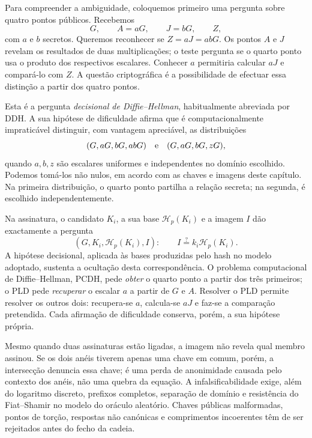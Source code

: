 Para compreender a ambiguidade, coloquemos primeiro uma pergunta sobre
quatro pontos públicos. Recebemos
\[
 G,\qquad A=aG,\qquad J=bG,\qquad Z,
\]
com \(a\) e \(b\) secretos. Queremos reconhecer se \(Z=aJ=abG\).
Os pontos \(A\) e \(J\) revelam os resultados de duas multiplicações;
o teste pergunta se o quarto ponto usa o produto dos respectivos
escalares. Conhecer \(a\) permitiria calcular \(aJ\) e compará-lo com
\(Z\). A questão criptográfica é a possibilidade de efectuar essa
distinção a partir dos quatro pontos.

Esta é a pergunta \emph{decisional de Diffie--Hellman}, habitualmente
abreviada por DDH. A sua hipótese de dificuldade afirma que é
computacionalmente impraticável distinguir, com vantagem apreciável,
as distribuições
\[
 (G,aG,bG,abG)
 \quad\hbox{e}\quad
 (G,aG,bG,zG),
\]
quando \(a,b,z\) são escalares uniformes e independentes no domínio
escolhido. Podemos tomá-los não nulos, em acordo com as chaves e imagens
deste capítulo. Na primeira distribuição, o quarto ponto partilha a
relação secreta; na segunda, é escolhido independentemente.

Na assinatura, o candidato \(K_i\), a sua base \(\mathcal H_p(K_i)\)
e a imagem \(I\) dão exactamente a pergunta
\[
 (G,K_i,\mathcal H_p(K_i),I):
 \qquad I\stackrel{?}{=}k_i\mathcal H_p(K_i).
\]
A hipótese decisional, aplicada às bases produzidas pelo hash no modelo
adoptado, sustenta a ocultação desta correspondência. O problema
computacional de Diffie--Hellman, PCDH, pede \emph{obter} o quarto ponto
a partir dos três primeiros; o PLD pede \emph{recuperar} o escalar \(a\)
a partir de \(G\) e \(A\). Resolver o PLD permite resolver os outros dois:
recupera-se \(a\), calcula-se \(aJ\) e faz-se a comparação pretendida.
Cada afirmação de dificuldade conserva, porém, a sua hipótese própria.

Mesmo quando duas assinaturas estão ligadas, a imagem não revela qual membro
assinou. Se os dois anéis tiverem apenas uma chave em comum, porém, a
intersecção denuncia essa chave; é uma perda de anonimidade causada pelo
contexto dos anéis, não uma quebra da equação. A infalsificabilidade exige,
além do logaritmo discreto, prefixos completos, separação de domínio e
resistência do Fiat--Shamir no modelo do oráculo aleatório. Chaves públicas
malformadas, pontos de torção, respostas não canónicas e comprimentos
incoerentes têm de ser rejeitados antes do fecho da cadeia.

